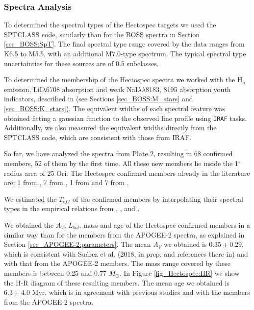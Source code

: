 \documentclass[12pt]{article}
\newcounter{subsubsubsection}[subsubsection]
\begin{document}
\subsubsection{Spectra Analysis}
\label{sec_Hectospec:analysis}

\label{sec_Hectospec:SpT}
To determined the spectral types of the Hectospec targets we used the SPTCLASS code, similarly than for the BOSS spectra in Section \ref{sec_BOSS:SpT}. The final spectral type range covered by the data ranges from K6.5 to M5.5, with an additional M7.0-type spectrum. The typical spectral type uncertainties for these sources are of 0.5 subclasses.

\label{sec_Hectospec:membership}
To determined the membership of the Hectospec spectra we worked with the H$_\alpha$ emission, LiI$\lambda$6708 absorption and weak NaI$\lambda\lambda$8183, 8195 absorption youth indicators, described in \citet{Suarez2017} (see Sections \ref{sec_BOSS:M_stars} and \ref{sec_BOSS:K_stars}). The equivalent widths of each spectral feature was obtained fitting a gaussian function to the observed line profile using \texttt{IRAF} tasks. Additionally, we also measured the equivalent widths directly from the SPTCLASS code, which are consistent with those from IRAF.

So far, we have analyzed the spectra from Plate 2, resulting in 68 confirmed members, 52 of them by the first time. All these new members lie inside the 1$^\circ$ radius area of 25 Ori. The Hectospec confirmed members already in the literature are: 1 from \citet{Briceno2007}, 7 from \citet{Downes2014}, 1 from \citet{Suarez2017} and 7 from \citet{Briceno2018}.

\label{sec_Hectospec:parameters}
We estimated the $T_{eff}$ of the confirmed members by interpolating their spectral types in the empirical relations from \citet{Kenyon-Hartmann1995}, \citet{Luhman1999}, \citet{Briceno2002} and \citet{Luhman2003b}.

We obtained the $A_V$, $L_{bol}$, mass and age of the Hectospec confirmed members in a similar way than for the members from the APOGEE-2 spectra, as explained in Section \ref{sec_APOGEE-2:parameters}. The mean $A_V$ we obtained is $0.35\pm0.29$, which is consistent with Su\'arez et al. (2018, in prep. and references there in) and with that from the APOGEE-2 members. The mass range covered by these members is between 0.25 and 0.77 $M_\odot$. In Figure \ref{fig_Hectospec:HR} we show the H-R diagram of these resulting members. The mean age we obtained is $6.3\pm4.0$ Myr, which is in agreement with previous studies \citep[][ and references there in]{Briceno2018} and with the members from the APOGEE-2 spectra.
\end{document}
